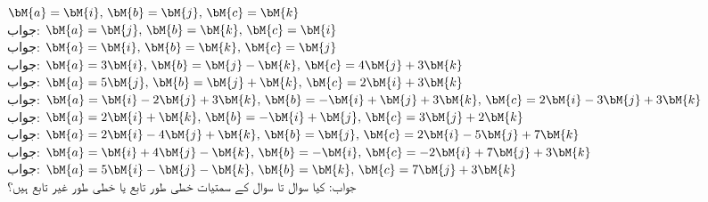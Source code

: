 \quad
$\bM{a}=\bM{i},\,\bM{b}=\bM{j},\,\bM{c}=\bM{k}$\\
جواب:
\quad
$\bM{a}=\bM{j},\,\bM{b}=\bM{k},\,\bM{c}=\bM{i}$\\
جواب:
\quad
$\bM{a}=\bM{i},\,\bM{b}=\bM{k},\,\bM{c}=\bM{j}$\\
جواب:
\quad
$\bM{a}=3\bM{i},\,\bM{b}=\bM{j}-\bM{k},\,\bM{c}=4\bM{j}+3\bM{k}$\\
جواب:
\quad
$\bM{a}=5\bM{j},\,\bM{b}=\bM{j}+\bM{k},\,\bM{c}=2\bM{i}+3\bM{k}$\\
جواب:
\quad
$\bM{a}=\bM{i}-2\bM{j}+3\bM{k},\,\bM{b}=-\bM{i}+\bM{j}+3\bM{k},\,\bM{c}=2\bM{i}-3\bM{j}+3\bM{k}$\\
جواب:
\quad
$\bM{a}=2\bM{i}+\bM{k},\,\bM{b}=-\bM{i}+\bM{j},\,\bM{c}=3\bM{j}+2\bM{k}$\\
جواب:
\quad
$\bM{a}=2\bM{i}-4\bM{j}+\bM{k},\,\bM{b}=\bM{j},\,\bM{c}=2\bM{i}-5\bM{j}+7\bM{k}$\\
جواب:
\quad
$\bM{a}=\bM{i}+4\bM{j}-\bM{k},\,\bM{b}=-\bM{i},\,\bM{c}=-2\bM{i}+7\bM{j}+3\bM{k}$\\
جواب:
\quad
$\bM{a}=5\bM{i}-\bM{j}-\bM{k},\,\bM{b}=\bM{k},\,\bM{c}=7\bM{j}+3\bM{k}$\\
جواب:
کیا سوال  تا سوال  کے سمتیات خطی طور تابع یا خطی طور غیر تابع ہیں؟ 

